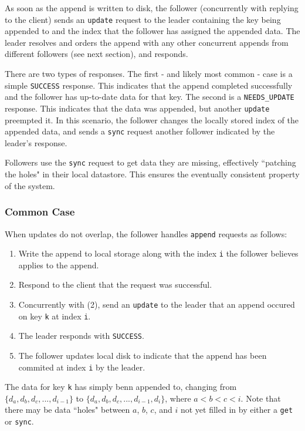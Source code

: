 \documentclass[11pt,english,twocolumn]{article}
\begin{document}
As soon as the append is written to disk, the follower (concurrently with
replying to the client) sends an \texttt{update} request to the leader
containing the key being appended to and the index that the follower has
assigned the appended data. The leader resolves and orders the append with any
other concurrent appends from different followers (see next section), and
responds.

There are two types of responses. The first - and likely most common - case
is a simple \texttt{SUCCESS} response. This indicates that the append completed
successfully and the follower has up-to-date data for that key. The second is a
\texttt{NEEDS\_UPDATE} response. This indicates that the data was appended, but
another \texttt{update} preempted it. In this scenario, the follower changes the
locally stored index of the appended data, and sends a \texttt{sync} request
another follower indicated by the leader's response.

Followers use the \texttt{sync} request to get data they are missing,
effectively ``patching the holes" in their local datastore. This ensures the
eventually consistent property of the system.

\subsubsection{Common Case}
When updates do not overlap, the follower handles \texttt{append} requests as
follows:

\begin{enumerate}
	\item Write the append to local storage along with the index \texttt{i}
		the follower believes applies to the append.
	\item Respond to the client that the request was successful.
	\item Concurrently with (2), send an \texttt{update} to the leader that
		an append occured on key \texttt{k} at index \texttt{i}.
	\item The leader responds with \texttt{SUCCESS}.
	\item The follower updates local disk to indicate that the append has
		been commited at index \texttt{i} by the leader.
\end{enumerate}

The data for key \texttt{k} has simply benn appended to, changing from $\{d_a,
d_b, d_c, ..., d_{i-1}\}$ to $\{d_a, d_b, d_c, ..., d_{i-1}, d_i\}$, where $a < b <
c < i$. Note that there may be data ``holes" between $a$, $b$, $c$, and $i$ not
yet filled in by either a \texttt{get} or \texttt{sync}.
\end{document}

